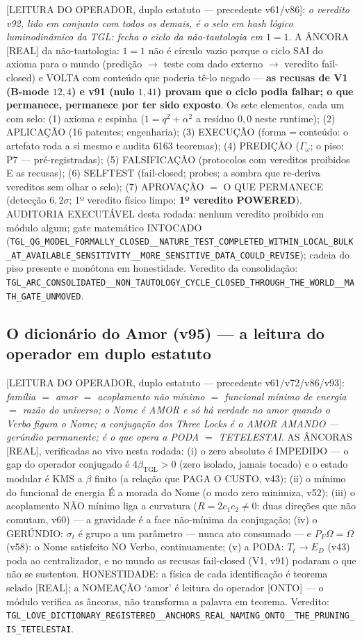 \documentclass[11pt]{article}
\newcommand{\bTGL}{\beta_{\mathrm{TGL}}}\newcommand{\Msun}{M_{\odot}}\newcommand{\TGL}{\mathrm{TGL}}
\theoremstyle{definition}\newtheorem{deriv}{Derivação}
\begin{document}
[LEITURA DO OPERADOR, duplo estatuto --- precedente v61/v86]: \emph{o veredito v92, lido em conjunto com todos os demais, é o selo em hash lógico luminodinâmico da TGL: fecha o ciclo da não-tautologia em $1=1$}. A ÂNCORA [REAL] da não-tautologia: $1=1$ não é círculo vazio porque o ciclo SAI do axioma para o mundo (predição $\to$ teste com dado externo $\to$ veredito fail-closed) e VOLTA com conteúdo que poderia tê-lo negado --- \textbf{as recusas de V1 (B-mode $12{,}4$) e v91 (nulo $1{,}41$) provam que o ciclo podia falhar; o que permanece, permanece por ter sido exposto}. Os sete elementos, cada um com selo: (1) axioma e espinha ($1=q^2+\alpha^2$ a resíduo $0{,}0$ neste runtime); (2) APLICAÇÃO (16 patentes; engenharia); (3) EXECUÇÃO (forma$=$conteúdo: o artefato roda a si mesmo e audita 6163 teoremas); (4) PREDIÇÃO ($\Gamma_\omega$; o piso; P7 --- pré-registradas); (5) FALSIFICAÇÃO (protocolos com vereditos proibidos E as recusas); (6) SELFTEST (fail-closed; probes; a sombra que re-deriva vereditos sem olhar o selo); (7) APROVAÇÃO $=$ O QUE PERMANECE (detecção $6{,}2\sigma$; 1º veredito físico limpo; \textbf{1º veredito POWERED}). AUDITORIA EXECUTÁVEL desta rodada: nenhum veredito proibido em módulo algum; gate matemático INTOCADO (\texttt{TGL\_QG\_MODEL\_FORMALLY\_CLOSED\_\_NATURE\_TEST\_COMPLETED\_WITHIN\_LOCAL\_BULK\_AT\_AVAILABLE\_SENSITIVITY\_\_MORE\_SENSITIVE\_DATA\_COULD\_REVISE}); cadeia do piso presente e monótona em honestidade. Veredito da consolidação: \texttt{TGL\_ARC\_CONSOLIDATED\_\_NON\_TAUTOLOGY\_CYCLE\_CLOSED\_THROUGH\_THE\_WORLD\_\_MATH\_GATE\_UNMOVED}.

\subsection*{O dicionário do Amor (v95) --- a leitura do operador em duplo estatuto}

[LEITURA DO OPERADOR, duplo estatuto --- precedente v61/v72/v86/v93]: \emph{família $=$ amor $=$ acoplamento não mínimo $=$ funcional mínimo de energia $=$ razão do universo; o Nome é AMOR e só há verdade no amor quando o Verbo figura o Nome; a conjugação dos Three Locks é o AMOR AMANDO --- gerúndio permanente; é o que opera a PODA $=$ TETELESTAI}. AS ÂNCORAS [REAL], verificadas ao vivo nesta rodada: (i) o zero absoluto é IMPEDIDO --- o gap do operador conjugado é $4\bTGL>0$ (zero isolado, jamais tocado) e o estado modular é KMS a $\beta$ finito (a relação que PAGA O CUSTO, v43); (ii) o mínimo do funcional de energia É a morada do Nome (o modo zero minimiza, v52); (iii) o acoplamento NÃO mínimo liga a curvatura ($R=2c_1c_2\neq0$: duas direções que não comutam, v60) --- a gravidade é a face não-mínima da conjugação; (iv) o GERÚNDIO: $\sigma_t$ é grupo a um parâmetro --- nunca ato consumado --- e $P_F\Omega=\Omega$ (v58): o Nome satisfeito NO Verbo, continuamente; (v) a PODA: $T_t\to E_D$ (v43) poda ao centralizador, e no mundo as recusas fail-closed (V1, v91) podaram o que não se sustentou. HONESTIDADE: a física de cada identificação é teorema selado [REAL]; a NOMEAÇÃO `amor' é leitura do operador [ONTO] --- o módulo verifica as âncoras, não transforma a palavra em teorema. Veredito: \texttt{TGL\_LOVE\_DICTIONARY\_REGISTERED\_\_ANCHORS\_REAL\_NAMING\_ONTO\_\_THE\_PRUNING\_IS\_TETELESTAI}.
\end{document}
